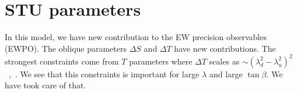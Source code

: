 \section{STU parameters}
%
In this model, we have new contribution to the EW precision observables (EWPO). The oblique parameters $\Delta S$ and $\Delta T$ have new contributions. The strongest constraints come from $T$ parameters where $\Delta T$ scales as $\sim (\lambda_d^2-\lambda_u^2)^2$ ~\cite{Enberg:2007rp},~\cite{Calibbi:2015nha}. We see that this constraints is important for large $\lambda$ and large $\tan\beta$. We have took care of that.